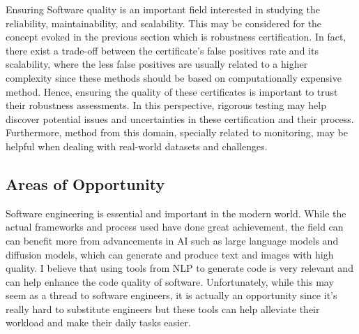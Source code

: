 \documentclass[a4paper,11pt]{article}
\begin{document}
Ensuring Software quality is an important field interested in studying the reliability, maintainability, and scalability. This may be considered for the concept evoked in the previous section which is robustness certification. In fact, there exist a trade-off between the certificate's false positives rate and its scalability, where the less false positives are usually related to a higher complexity since these methods should be based on computationally expensive method. Hence, ensuring the quality of these certificates is important to trust their robustness assessments. In this perspective, rigorous testing may help discover potential issues and uncertainties in these certification and their process. Furthermore, method from this domain, specially related to monitoring, may be helpful when dealing with real-world datasets and challenges.

\subsection{Areas of Opportunity}

Software engineering is essential and important in the modern world. While the actual frameworks and process used have done great achievement, the field can can benefit more from advancements in AI such as large language models and diffusion models, which can generate and produce text and images with high quality. I believe that using tools from NLP to generate code is very relevant and can help enhance the code quality of software. Unfortunately, while this may seem as a thread to software engineers, it is actually an opportunity since it's really hard to substitute engineers but these tools can help alleviate their workload and make their daily tasks easier. \\
\end{document}
